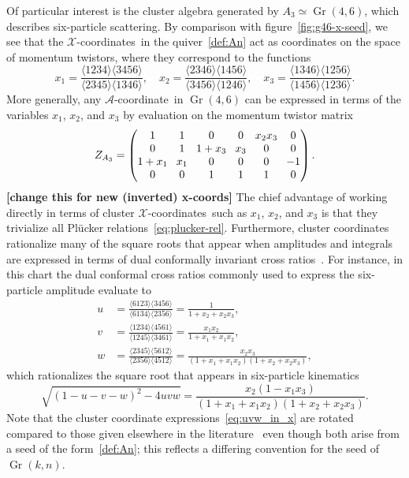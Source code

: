 \documentclass[11pt]{article}
\DeclareMathOperator{\Gr}{Gr}
\def\ket#1{\langle #1 \rangle}
\def\xcoords{$\mathcal{X}$-coordinates}
\def\acoord{$\mathcal{A}$-coordinate}
\def\draftnote#1{{\bf [#1]}}
\begin{document}
Of particular interest is the cluster algebra generated by $A_3 \simeq \Gr(4,6)$, which describes six-particle scattering. By comparison with figure~\ref{fig:g46-x-seed}, we see that the \xcoords\ in the quiver~\eqref{def:An} act as coordinates on the space of momentum twistors, where they correspond to the functions
\begin{equation}\label{eq:a3-seed-def}
x_1 = \frac{\ket{1234}\ket{3456}}{\ket{2345}\ket{1346}}, \quad x_2 = \frac{\ket{2346}\ket{1456}}{\ket{3456}\ket{1246}}, \quad x_3 = \frac{\ket{1346}\ket{1256}}{\ket{1456}\ket{1236}}.
\end{equation}
More generally, any \acoord\ in $\Gr(4,6)$ can be expressed in terms of the variables $x_1$, $x_2$, and $x_3$ by evaluation on the momentum twistor matrix
\begin{equation} \label{eq:a3_momentum_twistor_matrix}
Z_{A_3} = 
\begingroup
\setlength\arraycolsep{4pt}
\begin{pmatrix} 
1 & 1 & 0 & 0 & x_2 x_3 & 0 \\
0 & 1 & 1+x_3 & x_3 & 0 & 0 \\
1+x_1 & x_1 & 0 & 0 & 0 & -1 \\
0 & 0 & 1 & 1 & 1 & 0
\end{pmatrix}.
\endgroup 
\end{equation}
\draftnote{change this for new (inverted) x-coords}
The chief advantage of working directly in terms of cluster \xcoords\ such as $x_1$, $x_2$, and $x_3$ is that they trivialize all Pl\"ucker relations~\eqref{eq:plucker-rel}. Furthermore, cluster coordinates rationalize many of the square roots that appear when amplitudes and integrals are expressed in terms of dual conformally invariant cross ratios~\cite{Bourjaily:2018aeq}. For instance, in this chart the dual conformal cross ratios commonly used to express the six-particle amplitude evaluate to
\begin{align} \label{eq:uvw_in_x}
u &= \frac{\ket{6123}\ket{3456}}{\ket{6134}\ket{2356}} = \frac{1}{1+x_2+x_2 x_3}, \\ 
v &= \frac{\ket{1234} \ket{4561}}{\ket{1245}\ket{3461}} =\frac{x_1 x_2}{1+x_1+x_1 x_2}, \\ 
w &= \frac{\ket{2345} \ket{5612}}{\ket{2356}\ket{4512}} =\frac{x_2 x_3}{(1+x_1+x_1 x_2)(1+x_2+x_2 x_3)},
\end{align}
which rationalizes the square root that appears in six-particle kinematics 
\begin{equation}
\sqrt{(1 - u - v - w)^2 - 4 u v w} = \frac{x_2 \left(1-x_1 x_3\right)}{\left(1+x_1+x_1
   x_2\right) \left(1+x_2+x_2 x_3\right)} .
\end{equation}
Note that the cluster coordinate expressions~\eqref{eq:uvw_in_x} are rotated compared to those given elsewhere in the literature~\cite{Golden:2013xva,Parker:2015cia} even though both arise from a seed of the form~\eqref{def:An}; this reflects a differing convention for the seed of $\Gr(k,n)$.
\end{document}
